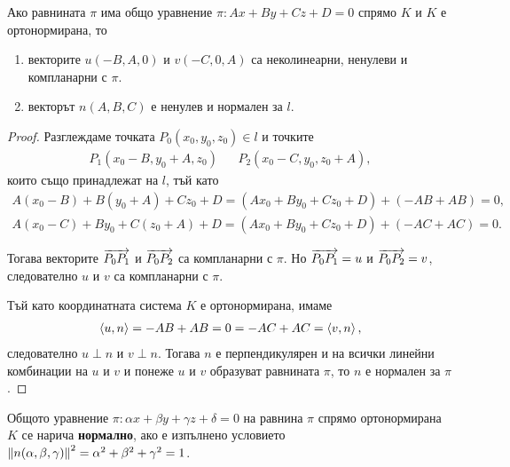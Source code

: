 \documentclass[numbers=endperiod, bibliography=totocnumbered]{scrartcl}
\begin{document}
\begin{proposition}
  Ако равнината \( \pi \) има общо уравнение \( \pi: Ax + By + Cz + D = 0 \) спрямо \( K \) и \( K \) е ортонормирана, то
  \begin{enumerate}
    \item векторите \( u(-B, A, 0) \) и \( v(-C, 0, A) \) са неколинеарни, ненулеви и компланарни с \( \pi \).
    \item векторът \( n(A, B, C) \) е ненулев и нормален за \( l \).
  \end{enumerate}
\end{proposition}
\begin{proof}
  \item Разглеждаме точката \( P_0(x_0, y_0, z_0) \in l \) и точките
  \begin{align*}
    P_1(x_0 - B, y_0 + A, z_0)
    &&
    P_2(x_0 - C, y_0, z_0 + A),
  \end{align*}
  които също принадлежат на \( l \), тъй като
  \begin{align*}
    A(x_0 - B) + B(y_0 + A) + Cz_0 + D = (Ax_0 + By_0 + Cz_0 + D) + (-AB + AB) = 0, \\
    A(x_0 - C) + By_0 + C(z_0 + A) + D = (Ax_0 + By_0 + Cz_0 + D) + (-AC + AC) = 0.
  \end{align*}

  Тогава векторите \( \overrightarrow{P_0 P_1} \) и \( \overrightarrow{P_0 P_2} \) са компланарни с \( \pi \). Но \( \overrightarrow{P_0 P_1} = u \) и \( \overrightarrow{P_0 P_2} = v \), следователно \( u \) и \( v \) са компланарни с \( \pi \).

  \item Тъй като координатната система \( K \) е ортонормирана, имаме
  \begin{align*}
    \left\langle u, n \right\rangle = -AB + AB = 0 = -AC + AC = \left\langle v, n \right\rangle,
  \end{align*}
  следователно \( u \perp n \) и \( v \perp n \). Тогава \( n \) е перпендикулярен и на всички линейни комбинации на \( u \) и \( v \) и понеже \( u \) и \( v \) образуват равнината \( \pi \), то \( n \) е нормален за \( \pi \).
\end{proof}

\begin{definition}
  Общото уравнение \( \pi: \alpha x + \beta y + \gamma z + \delta = 0 \) на равнина \( \pi \) спрямо ортонормирана \( K \) се нарича \textbf{нормално}, ако е изпълнено условието \( \left\Vert n(\alpha, \beta, \gamma) \right\Vert^2 = \alpha^2 + \beta^2 + \gamma^2 = 1 \).
\end{definition}
\end{document}

